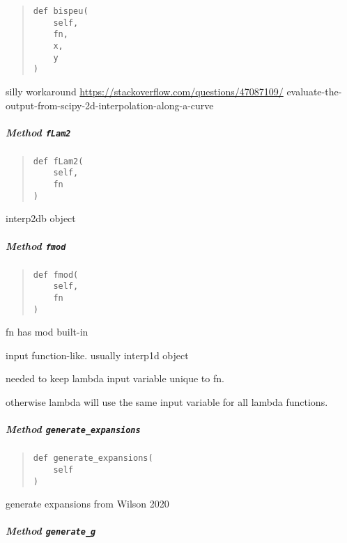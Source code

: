 \documentclass[
  english,
  a4paper,
  oneside]{article}
\begin{document}
\begin{quote}
\begin{verbatim}
def bispeu(
    self,
    fn,
    x,
    y
)
\end{verbatim}
\end{quote}

silly workaround \url{https://stackoverflow.com/questions/47087109/}
evaluate-the-output-from-scipy-2d-interpolation-along-a-curve

\hypertarget{StrongCoupling.StrongCoupling.fLam2}{%
\subparagraph{\texorpdfstring{Method
\texttt{fLam2}}{Method fLam2}}\label{StrongCoupling.StrongCoupling.fLam2}}

\begin{quote}
\begin{verbatim}
def fLam2(
    self,
    fn
)
\end{verbatim}
\end{quote}

interp2db object

\hypertarget{StrongCoupling.StrongCoupling.fmod}{%
\subparagraph{\texorpdfstring{Method
\texttt{fmod}}{Method fmod}}\label{StrongCoupling.StrongCoupling.fmod}}

\begin{quote}
\begin{verbatim}
def fmod(
    self,
    fn
)
\end{verbatim}
\end{quote}

fn has mod built-in

input function-like. usually interp1d object

needed to keep lambda input variable unique to fn.

otherwise lambda will use the same input variable for all lambda
functions.

\hypertarget{StrongCoupling.StrongCoupling.generate_expansions}{%
\subparagraph{\texorpdfstring{Method
\texttt{generate\_expansions}}{Method generate\_expansions}}\label{StrongCoupling.StrongCoupling.generate_expansions}}

\begin{quote}
\begin{verbatim}
def generate_expansions(
    self
)
\end{verbatim}
\end{quote}

generate expansions from Wilson 2020

\hypertarget{StrongCoupling.StrongCoupling.generate_g}{%
\subparagraph{\texorpdfstring{Method
\texttt{generate\_g}}{Method generate\_g}}\label{StrongCoupling.StrongCoupling.generate_g}}
\end{document}
